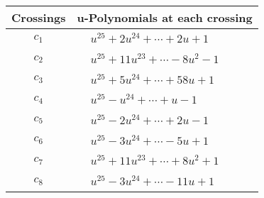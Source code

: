 \documentclass[1p]{elsarticle_modified}
\theoremstyle{definition}
\begin{document}
\begin{tabular}{m{50pt}|m{274pt}}
Crossings & \hspace{64pt}u-Polynomials at each crossing \\
\hline $$\begin{aligned}c_{1}\end{aligned}$$&$\begin{aligned}
&u^{25}+2 u^{24}+\cdots+2 u+1
\end{aligned}$\\
\hline $$\begin{aligned}c_{2}\end{aligned}$$&$\begin{aligned}
&u^{25}+11 u^{23}+\cdots-8 u^2-1
\end{aligned}$\\
\hline $$\begin{aligned}c_{3}\end{aligned}$$&$\begin{aligned}
&u^{25}+5 u^{24}+\cdots+58 u+1
\end{aligned}$\\
\hline $$\begin{aligned}c_{4}\end{aligned}$$&$\begin{aligned}
&u^{25}- u^{24}+\cdots+u-1
\end{aligned}$\\
\hline $$\begin{aligned}c_{5}\end{aligned}$$&$\begin{aligned}
&u^{25}-2 u^{24}+\cdots+2 u-1
\end{aligned}$\\
\hline $$\begin{aligned}c_{6}\end{aligned}$$&$\begin{aligned}
&u^{25}-3 u^{24}+\cdots-5 u+1
\end{aligned}$\\
\hline $$\begin{aligned}c_{7}\end{aligned}$$&$\begin{aligned}
&u^{25}+11 u^{23}+\cdots+8 u^2+1
\end{aligned}$\\
\hline $$\begin{aligned}c_{8}\end{aligned}$$&$\begin{aligned}
&u^{25}-3 u^{24}+\cdots-11 u+1
\end{aligned}$\\

\end{tabular}
\end{document}
